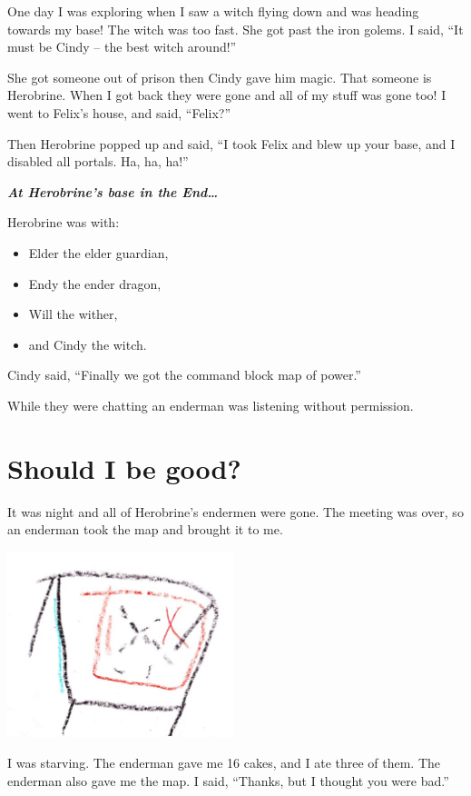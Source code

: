 \documentclass[oneside]{book}
\providecommand{\tightlist}{%
  \setlength{\itemsep}{0pt}\setlength{\parskip}{0pt}}
\begin{document}
One day I was exploring when I saw a witch flying down and was heading
towards my base! The witch was too fast. She got past the iron golems. I
said, ``It must be Cindy -- the best witch around!''

She got someone out of prison then Cindy gave him magic. That someone is
Herobrine. When I got back they were gone and all of my stuff was gone
too! I went to Felix's house, and said, ``Felix?''

Then Herobrine popped up and said, ``I took Felix and blew up your base,
and I disabled all portals. Ha, ha, ha!''

\textbf{\emph{At Herobrine's base in the End\ldots{}}}

Herobrine was with:

\begin{itemize}
\tightlist
\item
  Elder the elder guardian,
\item
  Endy the ender dragon,
\item
  Will the wither,
\item
  and Cindy the witch.
\end{itemize}

Cindy said, ``Finally we got the command block map of power.''

While they were chatting an enderman was listening without permission.

\chapter{Should I be good?}\label{should-i-be-good}

It was night and all of Herobrine's endermen were gone. The meeting was
over, so an enderman took the map and brought it to me.

\includegraphics[width=2.60417in]{img/table-and-map.jpg}

I was starving. The enderman gave me 16 cakes, and I ate three of them.
The enderman also gave me the map. I said, ``Thanks, but I thought you
were bad.''
\end{document}
